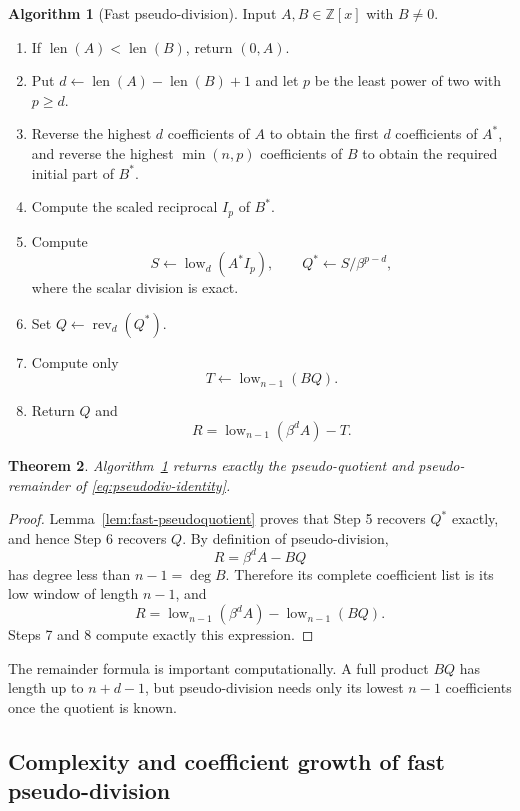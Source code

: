 \documentclass[11pt]{book}
\newtheorem{theorem}{Theorem}[section]
\theoremstyle{definition}
\newtheorem{algorithm}[theorem]{Algorithm}
\newcommand{\ZZ}{\mathbb Z}
\newcommand{\len}{\operatorname{len}}
\begin{document}
\begin{algorithm}[Fast pseudo-division]\label{alg:pseudodiv-fast}
Input $A,B\in\ZZ[x]$ with $B\ne0$.
\begin{enumerate}
 \item If $\len(A)<\len(B)$, return $(0,A)$.
 \item Put $d\leftarrow\len(A)-\len(B)+1$ and let $p$ be the least power of
 two with $p\ge d$.
 \item Reverse the highest $d$ coefficients of $A$ to obtain the first $d$
 coefficients of $A^*$, and reverse the highest $\min(n,p)$ coefficients of
 $B$ to obtain the required initial part of $B^*$.
 \item Compute the scaled reciprocal $I_p$ of $B^*$.
 \item Compute
 \[
  S\leftarrow\operatorname{low}_d(A^*I_p),
  \qquad
  Q^*\leftarrow S/\beta^{p-d},
 \]
 where the scalar division is exact.
 \item Set $Q\leftarrow\operatorname{rev}_d(Q^*)$.
 \item Compute only
 \[
  T\leftarrow\operatorname{low}_{n-1}(BQ).
 \]
 \item Return $Q$ and
 \[
  R=\operatorname{low}_{n-1}(\beta^dA)-T.
 \]
\end{enumerate}
\end{algorithm}

\begin{theorem}\label{thm:pseudodiv-fast-correctness}
Algorithm~\ref{alg:pseudodiv-fast} returns exactly the pseudo-quotient and
pseudo-remainder of \eqref{eq:pseudodiv-identity}.
\end{theorem}

\begin{proof}
Lemma~\ref{lem:fast-pseudoquotient} proves that Step 5 recovers $Q^*$ exactly,
and hence Step 6 recovers $Q$.  By definition of pseudo-division,
\[
 R=\beta^dA-BQ
\]
has degree less than $n-1=\deg B$.  Therefore its complete coefficient list is
its low window of length $n-1$, and
\[
 R
 =\operatorname{low}_{n-1}(\beta^dA)
  -\operatorname{low}_{n-1}(BQ).
\]
Steps 7 and 8 compute exactly this expression.
\end{proof}

The remainder formula is important computationally.  A full product $BQ$ has
length up to $n+d-1$, but pseudo-division needs only its lowest $n-1$
coefficients once the quotient is known.

\subsection{Complexity and coefficient growth of fast pseudo-division}
\end{document}
